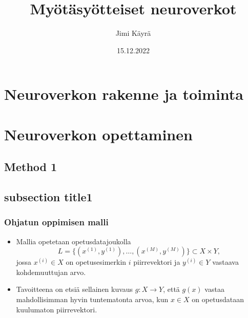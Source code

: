 \documentclass{beamer} %
\title{Myötäsyötteiset neuroverkot}
\author[Jimi Käyrä]{Jimi Käyrä}
\institute[Oulun yliopisto]{Oulun yliopisto}
\date[15.12.2022]{15.12.2022}
\theoremstyle{definition}
\begin{document}
\renewcommand{\headrulewidth}{0pt}  
\renewcommand{\footrulewidth}{0pt}

\frame{\titlepage}
\setlength{\headheight}{0pt}

\section{Neuroverkon rakenne ja toiminta}
\section{Neuroverkon opettaminen}
    \subsection{Method 1}

\subsection{subsection title1}
\begin{frame}\frametitle{Ohjatun oppimisen malli}
\begin{itemize}
\item Mallia opetetaan opetusdatajoukolla \[L=\{(x^{(1)}, y^{(1)}), \ldots, (x^{(M)}, y^{(M)})\}\subset X\times Y,\] jossa \(x^{(i)}\in X\) on opetusesimerkin \(i\) piirrevektori ja \(y^{(i)}\in Y\) vastaava kohdemuuttujan arvo.

\item Tavoitteena on etsiä sellainen kuvaus \(g : X\to Y\), että \(g(x)\) vastaa mahdollisimman hyvin tuntematonta arvoa, kun \(x\in X\) on opetusdataan kuulumaton piirrevektori.

\end{itemize}\vspace{0.2in}

\begin{center}
\end{center}
\end{frame}
\end{document}
